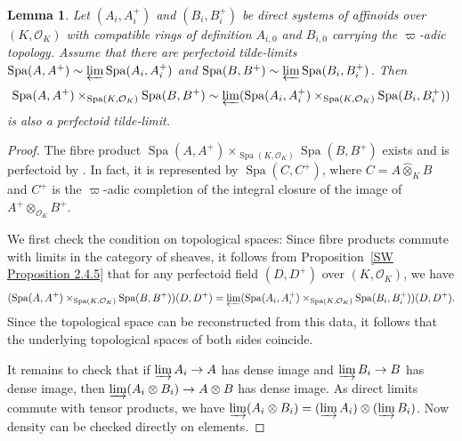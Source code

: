 \documentclass[10pt,oneside]{amsart}
\newtheorem{lemma}[theorem]{Lemma}
\theoremstyle{definition}
\renewcommand{\O}{\mathcal{O}}
\begin{document}
	\begin{lemma}\label{affinoid tilde-limits commute with fibre products}
		Let $(A_i, A_i^+)$ and $(B_i, B_i^+)$ be direct systems of affinoids over $(K, \mathcal O_K)$ with compatible rings of definition $A_{i,0}$ and $B_{i,0}$ carrying the $\varpi$-adic topology. Assume that there are perfectoid tilde-limits $\operatorname{Spa}(A, A^+)\sim \varprojlim \operatorname{Spa}(A_i, A_i^+)$ and $\operatorname{Spa}(B, B^+)\sim \varprojlim \operatorname{Spa}(B_i, B_i^+)$. Then \[\operatorname{Spa}(A, A^+)\times_{\operatorname{Spa}(K, \mathcal O_K)}\operatorname{Spa}(B, B^+)\sim\varprojlim (\operatorname{Spa}(A_i, A_i^+)\times_{\operatorname{Spa}(K, \mathcal O_K)} \operatorname{Spa}(B_i, B_i^+))\]
		is also a perfectoid tilde-limit.
	\end{lemma}
	\begin{proof}
		The fibre product $\operatorname{Spa}(A, A^+)\times_{\operatorname{Spa}(K, \mathcal O_K)}\operatorname{Spa}(B, B^+)$ exists and is perfectoid by \cite[Prop 6.18]{perfectoid}. In fact, it is represented by $\operatorname{Spa}(C,C^+)$, where $C=A\widehat{\otimes}_KB$ and $C^+$ is the $\varpi$-adic completion of the integral closure of the image of $A^+\otimes_{\mathcal O_K}B^+$.
		
		We first check the condition on topological spaces:
		 Since fibre products commute with limits in the category of sheaves, it follows from Proposition~\ref{SW Proposition 2.4.5} that for any perfectoid field $(D,D^+)$ over $(K,\O_K)$, we have 
\[
 (\operatorname{Spa}(A, A^+)\times_{\operatorname{Spa}(K, \mathcal O_K)}\operatorname{Spa}(B, B^+))(D,D^+)=\varprojlim (\operatorname{Spa}(A_i, A_i^+)\times_{\operatorname{Spa}(K, \mathcal O_K)} \operatorname{Spa}(B_i, B_i^+))(D,D^+).
\]
 Since the topological space can be reconstructed from this data, it follows that the underlying topological spaces of both sides coincide.
		
		It remains to check that if $\varinjlim A_i \rightarrow A$ has dense image and $\varinjlim B_i \rightarrow B$ has dense image, then $\varinjlim (A_i\otimes B_i) \rightarrow A\otimes B$ has dense image. As direct limits commute with tensor products, we have $\varinjlim (A_i\otimes B_i) = (\varinjlim A_i)\otimes (\varinjlim B_i)$. Now density can be checked directly on elements. 
	\end{proof}
\end{document}
